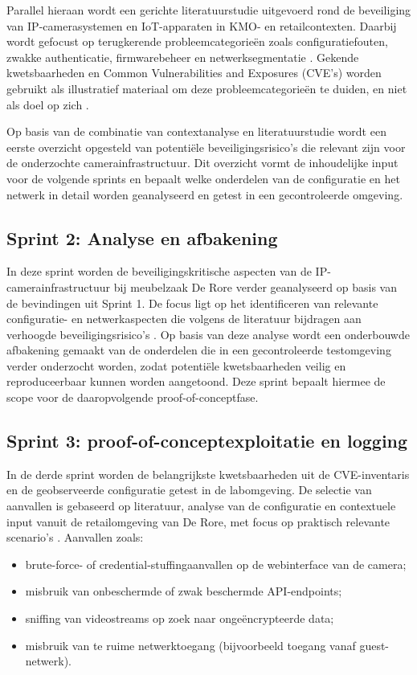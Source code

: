 Parallel hieraan wordt een gerichte literatuurstudie uitgevoerd rond de beveiliging van \newline IP-camerasystemen en IoT-apparaten in KMO- en retailcontexten. Daarbij wordt gefocust op terugkerende probleemcategorieën zoals configuratiefouten, zwakke authenticatie, firmwarebeheer en netwerksegmentatie \parencite{Butun2019arXivIoTSecurity}. Gekende kwetsbaarheden en Common Vulnerabilities and Exposures (CVE’s) worden gebruikt als illustratief materiaal om deze probleemcategorieën te duiden, en niet als doel op zich \parencite{NVD2025}.

Op basis van de combinatie van contextanalyse en literatuurstudie wordt een eerste overzicht opgesteld van potentiële beveiligingsrisico’s die relevant zijn voor de onderzochte camerainfrastructuur. Dit overzicht vormt de inhoudelijke input voor de volgende sprints en bepaalt welke onderdelen van de configuratie en het netwerk in detail worden geanalyseerd en getest in een gecontroleerde omgeving.

\subsection*{Sprint 2: Analyse en afbakening}
In deze sprint worden de beveiligingskritische aspecten van de IP-camerainfrastructuur bij meubelzaak De Rore verder geanalyseerd op basis van de bevindingen uit Sprint 1. De focus ligt op het identificeren van relevante configuratie- en netwerkaspecten die volgens de literatuur bijdragen aan verhoogde beveiligingsrisico’s \parencite{Butun2019arXivIoTSecurity}. Op basis van deze analyse wordt een onderbouwde afbakening gemaakt van de onderdelen die in een gecontroleerde testomgeving verder onderzocht worden, zodat potentiële kwetsbaarheden veilig en reproduceerbaar kunnen worden aangetoond. Deze sprint bepaalt hiermee de scope voor de daaropvolgende proof-of-conceptfase.

\subsection*{Sprint 3: proof-of-conceptexploitatie en logging}

In de derde sprint worden de belangrijkste kwetsbaarheden uit de CVE-inventaris en de geobserveerde configuratie getest in de labomgeving. De selectie van aanvallen is gebaseerd op literatuur, analyse van de configuratie en contextuele input vanuit de retailomgeving van De Rore, met focus op praktisch relevante scenario’s \parencite{Butun2019arXivIoTSecurity}. Aanvallen zoals:
\begin{itemize}
    \item brute-force- of credential-stuffingaanvallen op de webinterface van de camera;
    \item misbruik van onbeschermde of zwak beschermde API-endpoints;
    \item sniffing van videostreams op zoek naar ongeëncrypteerde data;
    \item misbruik van te ruime netwerktoegang (bijvoorbeeld toegang vanaf guest-netwerk).
\end{itemize}

